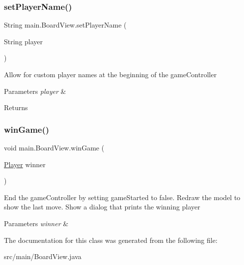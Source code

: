 \subsubsection{\texorpdfstring{set\+Player\+Name()}{setPlayerName()}}
{\footnotesize\ttfamily String main.\+Board\+View.\+set\+Player\+Name (\begin{DoxyParamCaption}\item[{String}]{player }\end{DoxyParamCaption})}

Allow for custom player names at the beginning of the game\+Controller 
\begin{DoxyParams}{Parameters}
{\em player} & \\
\hline
\end{DoxyParams}
\begin{DoxyReturn}{Returns}

\end{DoxyReturn}
\hypertarget{classmain_1_1_board_view_a44d95afe82790b029cc40627ab5a88cb}{}\label{classmain_1_1_board_view_a44d95afe82790b029cc40627ab5a88cb} 
\subsubsection{\texorpdfstring{win\+Game()}{winGame()}}
{\footnotesize\ttfamily void main.\+Board\+View.\+win\+Game (\begin{DoxyParamCaption}\item[{\hyperlink{classmain_1_1_player}{Player}}]{winner }\end{DoxyParamCaption})}

End the game\+Controller by setting game\+Started to false. Redraw the model to show the last move. Show a dialog that prints the winning player 
\begin{DoxyParams}{Parameters}
{\em winner} & \\
\hline
\end{DoxyParams}


The documentation for this class was generated from the following file\+:\begin{DoxyCompactItemize}
\item 
src/main/Board\+View.\+java\end{DoxyCompactItemize}
